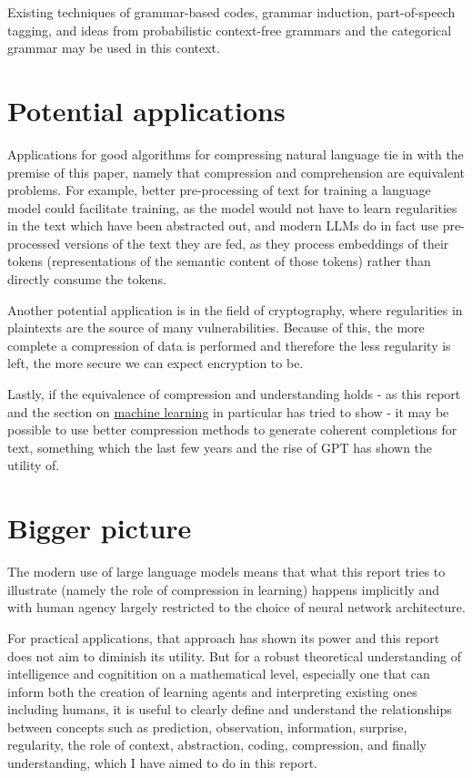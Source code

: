 Existing techniques of grammar-based codes, grammar induction, part-of-speech tagging, and ideas from probabilistic context-free grammars and the categorical grammar may be used in this context.


\section{Potential applications}

Applications for good algorithms for compressing natural language tie in with the premise of this paper, namely that compression and comprehension are equivalent problems. For example, better pre-processing of text for training a language model could facilitate training, as the model would not have to learn regularities in the text which have been abstracted out, and modern LLMs do in fact use pre-processed versions of the text they are fed, as they process embeddings of their tokens (representations of the semantic content of those tokens) rather than directly consume the tokens.

Another potential application is in the field of cryptography, where regularities in plaintexts are the source of many vulnerabilities. Because of this, the more complete a compression of data is performed and therefore the less regularity is left, the more secure we can expect encryption to be.

Lastly, if the equivalence of compression and understanding holds - as this report and the section on \hyperref[sec:machine_learning]{machine learning} in particular has tried to show - it may be possible to use better compression methods to generate coherent completions for text, something which the last few years and the rise of GPT has shown the utility of.

\section{Bigger picture}

The modern use of large language models means that what this report tries to illustrate (namely the role of compression in learning) happens implicitly and with human agency largely restricted to the choice of neural network architecture.

For practical applications, that approach has shown its power and this report does not aim to diminish its utility. But for a robust theoretical understanding of intelligence and cognitition on a mathematical level, especially one that can inform both the creation of learning agents and interpreting existing ones including humans, it is useful to clearly define and understand the relationships between concepts such as prediction, observation, information, surprise, regularity, the role of context, abstraction, coding, compression, and finally understanding, which I have aimed to do in this report.


